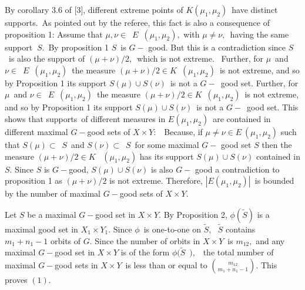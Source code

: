 \documentclass{article}
\begin{document}
{\large \bigskip }

{\large By corollary 3.6 of [3], different extreme points of $K(\mu _{1},\mu
_{2})$\ have distinct supports.\ As pointed out by the referee, this fact is
also a consequence of proposition 1: Assume that }$\mu ,\nu \in ${\large \ $%
E $\ $(\mu _{1},\mu _{2}),$ with }$\mu \neq \nu ,${\large \ having the same
support }$\ S.${\large \ By proposition 1 }$S${\large \ is }$G-${\large %
good. But this is a contradiction since }$S${\large \ is also the support of
}$(\mu +\nu )/2,${\large \ which is not extreme. \ Further, for $\mu $\ and $%
\nu \in $\ $E$\ $(\mu _{1},\mu _{2})$\ the measure $(\mu +\nu )/2\in K$\ $%
(\mu _{1},\mu _{2})$\ is not extreme, and so by Proposition 1 its support $%
S(\mu )\cup S(\nu )$\ is not a $G-$\ good set. Further, for $\mu $\ and $\nu
\in $\ $E$\ $(\mu _{1},\mu _{2})$\ the measure $(\mu +\nu )/2\in K$\ $(\mu
_{1},\mu _{2})$\ is not extreme, and so by Proposition 1 its support $S(\mu
)\cup S(\nu )$\ is not a $G-$\ good set. This shows that supports\ of
different measures in $E(\mu _{1},\mu _{2})$\ are contained in different
maximal $G-$good sets of $X\times Y:$ \ Because, if $\mu \neq \nu \in E\
(\mu _{1},\mu _{2})$ such that $S(\mu )$}$\subset ${\large \ }$S${\large \
and $S(\nu )$}$\subset ${\large \ }$S${\large \ for some maximal }$G-$%
{\large good set }$S$ {\large then the measure} {\large $(\mu +\nu )/2\in K$%
\ $(\mu _{1},\mu _{2})$ has its support $S(\mu )\cup S(\nu )$ contained in $%
S.$ Since $S$ is $G-$good,} {\large $S(\mu )\cup S(\nu )$ is also }$G-$%
{\large good a contradiction to proposition 1 as $(\mu +\nu )/2$ is not
extreme. Therefore, $|E(\mu _{1},\mu _{2})|$\ is bounded by the number of
maximal $G-$good sets of $X\times Y.$ }

{\large \bigskip}

{\large Let $S$ be a maximal $G-$good set in $X\times Y$. By Proposition 2, $%
\phi (\widetilde{S})$ is a maximal good set in $X_{1}\times Y_{1}$. Since $%
\phi $\ is one-to-one on $\widetilde{S}$, \ $\widetilde{S}$ contains $%
m_{1}+n_{1}-1$ orbits of $G$. Since the number of orbits in $X\times Y$\ is $%
m_{12},$ and any maximal $G-$good set in $X\times Y$ is of the form $\phi (%
\widetilde{S}$\ $),$ \ the total number of maximal $G-$good sets in $X\times
Y$\ is less than or equal to $\binom{m_{12}}{m_{1}+n_{1}-1}.$ This proves $%
(1).$ }

{\large \bigskip }
\end{document}
